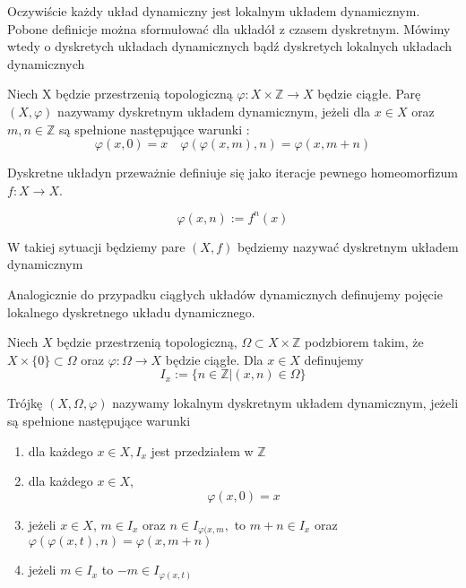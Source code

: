  Oczywiście każdy układ dynamiczny jest lokalnym układem dynamicznym. 
 Pobone definicje można sformułować dla układół z czasem dyskretnym. Mówimy wtedy o dyskretych układach dynamicznych bądź dyskretych lokalnych układach dynamicznych
 
 \begin{definition}
 \label{iterowanyUkladDynamiczny}
 
 
  Niech X będzie przestrzenią topologiczną $ \varphi : X \times \mathbb{Z} \to X $ będzie ciągłe. Parę $ (X,\varphi) $ nazywamy dyskretnym układem dynamicznym,
  jeżeli dla $ x \in X $ oraz $ m,n \in \mathbb Z $ są spełnione następujące warunki :
    $$
      \varphi(x,0) = x \quad
      \varphi(\varphi(x,m),n) = \varphi(x,m+n)
    $$
    
 \end{definition}
 
 Dyskretne układyn przeważnie definiuje się jako iteracje pewnego homeomorfizum $ f : X \to X $.
 
  $$
   \varphi(x,n) := f^n(x)
  $$
  
  W takiej sytuacji będziemy pare $(X,f)$ będziemy nazywać dyskretnym układem dynamicznym
  
  Analogicznie do przypadku ciągłych układów dynamicznych definujemy pojęcie lokalnego dyskretnego 
  układu dynamicznego.
  
  
  \begin{definition}
    Niech $ X $ będzie przestrzenią topologiczną, $\Omega \subset X \times \mathbb Z $ podzbiorem takim, że $ X\times \{0\} \subset \Omega $ 
    oraz $ \varphi : \Omega \to X $ będzie ciągłe. Dla $ x \in X $ definujemy 
    $$
	I_x := \{n \in \mathbb Z | (x,n) \in \Omega \}
    $$
    
    Trójkę $(X,\Omega,\varphi) $ nazywamy lokalnym dyskretnym układem dynamicznym, jeżeli są spełnione następujące warunki
    
    \begin{enumerate}
     \item dla każdego $ x\in X , I_x $ jest przedziałem w $ \mathbb Z $
     \item dla każdego $x\in X$, 
	    $$ \varphi(x,0) = x $$
     \item jeżeli $x \in X $, $ m \in I_x$ oraz $ n\in I_{\varphi(x,m},$ to $ m+n \in I_x $ oraz $ \varphi(\varphi(x,t),n) = \varphi(x,m+n) $
     \item jeżeli $ m\in I_x $ to $-m \in I_{\varphi(x,t)} $
    \end{enumerate}
    
    
    
  \end{definition}
  
